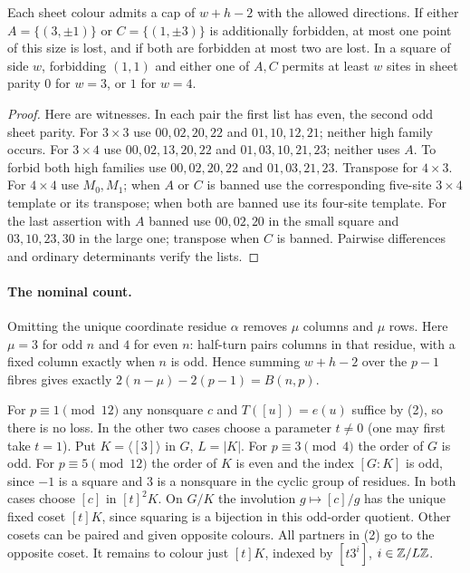 \documentclass[11pt]{article}
\begin{document}
\begin{lemma}\label{lem:templates}
Each sheet colour admits a cap of $w+h-2$ with the allowed directions. If either $A=\{(3,\pm1)\}$ or $C=\{(1,\pm3)\}$ is additionally forbidden, at most one point of this size is lost, and if both are forbidden at most two are lost. In a square of side $w$, forbidding $(1,1)$ and either one of $A,C$ permits at least $w$ sites in sheet parity $0$ for $w=3$, or $1$ for $w=4$.
\end{lemma}
\begin{proof} Here are witnesses. In each pair the first list has even, the second odd sheet parity. For $3\times3$ use $00,02,20,22$ and $01,10,12,21$; neither high family occurs. For $3\times4$ use $00,02,13,20,22$ and $01,03,10,21,23$; neither uses $A$. To forbid both high families use $00,02,20,22$ and $01,03,21,23$. Transpose for $4\times3$. For $4\times4$ use $M_0,M_1$; when $A$ or $C$ is banned use the corresponding five-site $3\times4$ template or its transpose; when both are banned use its four-site template. For the last assertion with $A$ banned use $00,02,20$ in the small square and $03,10,23,30$ in the large one; transpose when $C$ is banned. Pairwise differences and ordinary determinants verify the lists.\end{proof}

\paragraph{The nominal count.} Omitting the unique coordinate residue $\alpha$ removes $\mu$ columns and $\mu$ rows. Here $\mu=3$ for odd $n$ and $4$ for even $n$: half-turn pairs columns in that residue, with a fixed column exactly when $n$ is odd. Hence summing $w+h-2$ over the $p-1$ fibres gives exactly $2(n-\mu)-2(p-1)=B(n,p)$.

For $p\equiv1\pmod{12}$ any nonsquare $c$ and $T([u])=e(u)$ suffice by (2), so there is no loss. In the other two cases choose a parameter $t\ne0$ (one may first take $t=1$). Put $K=\langle[3]\rangle$ in $G$, $L=|K|$. For $p\equiv3\pmod4$ the order of $G$ is odd. For $p\equiv5\pmod{12}$ the order of $K$ is even and the index $[G:K]$ is odd, since $-1$ is a square and $3$ is a nonsquare in the cyclic group of residues. In both cases choose $[c]$ in $[t]^2K$. On $G/K$ the involution $g\mapsto[c]/g$ has the unique fixed coset $[t]K$, since squaring is a bijection in this odd-order quotient. Other cosets can be paired and given opposite colours. All partners in (2) go to the opposite coset. It remains to colour just $[t]K$, indexed by $[t3^i]$, $i\in\mathbb Z/L\mathbb Z$.
\end{document}
